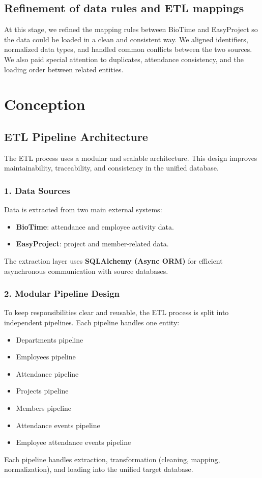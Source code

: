\subsection{Refinement of data rules and ETL mappings}
At this stage, we refined the mapping rules between BioTime and EasyProject so the data could be loaded in a clean and consistent way. We aligned identifiers, normalized data types, and handled common conflicts between the two sources. We also paid special attention to duplicates, attendance consistency, and the loading order between related entities.
\section{Conception}

\subsection{ETL Pipeline Architecture}
The ETL process uses a modular and scalable architecture. This design improves maintainability, traceability, and consistency in the unified database.

\subsubsection*{1. Data Sources}
Data is extracted from two main external systems:
\begin{itemize}[noitemsep]
    \item \textbf{BioTime}: attendance and employee activity data.
    \item \textbf{EasyProject}: project and member-related data.
\end{itemize}
The extraction layer uses \textbf{SQLAlchemy (Async ORM)} for efficient asynchronous communication with source databases.

\subsubsection*{2. Modular Pipeline Design}
To keep responsibilities clear and reusable, the ETL process is split into independent pipelines. Each pipeline handles one entity:
\begin{itemize}[noitemsep]
    \item Departments pipeline
    \item Employees pipeline
    \item Attendance pipeline
    \item Projects pipeline
    \item Members pipeline
    \item Attendance events pipeline
    \item Employee attendance events pipeline
\end{itemize}
Each pipeline handles extraction, transformation (cleaning, mapping, normalization), and loading into the unified target database.

